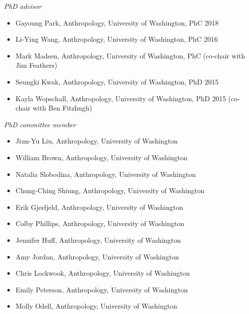 \medskip

\medskip

\noindent\emph{PhD advisor\vspace{0.01in}}

\medskip

\begin{itemize}[noitemsep, font=$\bullet$\scshape\bfseries]

\item Gayoung Park, Anthropology, University of Washington, PhC 2018

\item Li-Ying Wang, Anthropology, University of Washington, PhC 2016

\item Mark Madsen, Anthropology, University of Washington, PhC (co-chair with Jim Feathers)

\item Seungki Kwak, Anthropology, University of Washington, PhD 2015

\item Kayla Wopschall, Anthropology, University of Washington, PhD 2015 (co-chair with Ben Fitzhugh)

\end{itemize}

\medskip

\noindent\emph{PhD committee member\vspace{0.01in}}

\medskip

\begin{itemize}[noitemsep, font=$\bullet$\scshape\bfseries]

\item Jiun-Yu Liu, Anthropology, University of Washington

\item William Brown, Anthropology, University of Washington

\item Natalia Slobodina, Anthropology, University of Washington

\item Chung-Ching Shiung, Anthropology, University of Washington

\item Erik Gjesfjeld, Anthropology, University of Washington

\item Colby Phillips, Anthropology, University of Washington

\item Jennifer Huff, Anthropology, University of Washington

\item Amy Jordan, Anthropology, University of Washington

\item Chris Lockwook, Anthropology, University of Washington

\item Emily Peterson, Anthropology, University of Washington

\item Molly Odell, Anthropology, University of Washington

\end{itemize}

